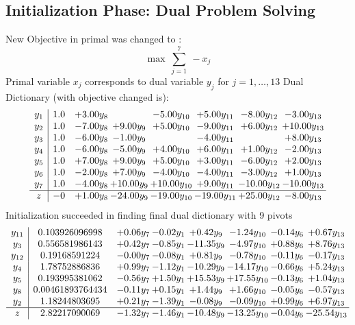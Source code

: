 \documentclass[9pt]{article}
\begin{document}
\subsection{Initialization Phase: Dual Problem Solving}
New Objective in primal was changed to : \[ \max\ \sum_{j=1}^{7}\ - x_j \] 
Primal variable $x_j$ corresponds to dual variable $y_j$ for $j = 1,\ldots,13$
Dual Dictionary (with objective changed is): 
\[\begin{array}{c| c c@{\hskip 2pt} c@{\hskip 2pt} c@{\hskip 2pt} c@{\hskip 2pt} c@{\hskip 2pt} c@{\hskip 2pt} }
 y_{1}   &  1.0 & +  3.00 y_{8} &   & -5.00 y_{10} & +  5.00 y_{11} & -8.00 y_{12} & -3.00 y_{13}\\
 y_{2}   &  1.0 & -7.00 y_{8} & +  9.00 y_{9} & +  5.00 y_{10} & -9.00 y_{11} & +  6.00 y_{12} & + 10.00 y_{13}\\
 y_{3}   &  1.0 & -6.00 y_{8} & -1.00 y_{9} &   & -4.00 y_{11} &   & +  8.00 y_{13}\\
 y_{4}   &  1.0 & -6.00 y_{8} & -5.00 y_{9} & +  4.00 y_{10} & +  6.00 y_{11} & +  1.00 y_{12} & -2.00 y_{13}\\
 y_{5}   &  1.0 & +  7.00 y_{8} & +  9.00 y_{9} & +  5.00 y_{10} & +  3.00 y_{11} & -6.00 y_{12} & +  2.00 y_{13}\\
 y_{6}   &  1.0 & -2.00 y_{8} & +  7.00 y_{9} & -4.00 y_{10} & -4.00 y_{11} & -3.00 y_{12} & +  1.00 y_{13}\\
 y_{7}   &  1.0 & -4.00 y_{8} & + 10.00 y_{9} & + 10.00 y_{10} & +  9.00 y_{11} & -10.00 y_{12} & -10.00 y_{13}\\
\hline
z    &  -0 & +  1.00 y_{8} & -24.00 y_{9} & -19.00 y_{10} & -19.00 y_{11} & + 25.00 y_{12} & -8.00 y_{13}\\
\end{array}\]
Initialization succeeded in finding final dual dictionary with 9 pivots
\[\begin{array}{c| c c@{\hskip 2pt} c@{\hskip 2pt} c@{\hskip 2pt} c@{\hskip 2pt} c@{\hskip 2pt} c@{\hskip 2pt} }
 y_{11}   &  0.103926096998 & +  0.06 y_{7} & -0.02 y_{1} & +  0.42 y_{9} & -1.24 y_{10} & -0.14 y_{6} & +  0.67 y_{13}\\
 y_{3}   &  0.556581986143 & +  0.42 y_{7} & -0.85 y_{1} & -11.35 y_{9} & -4.97 y_{10} & +  0.88 y_{6} & +  8.76 y_{13}\\
 y_{12}   &  0.19168591224 & -0.00 y_{7} & -0.08 y_{1} & +  0.81 y_{9} & -0.78 y_{10} & -0.11 y_{6} & -0.17 y_{13}\\
 y_{4}   &  1.78752886836 & +  0.99 y_{7} & -1.12 y_{1} & -10.29 y_{9} & -14.17 y_{10} & -0.66 y_{6} & +  5.24 y_{13}\\
 y_{5}   &  0.193995381062 & -0.56 y_{7} & +  1.50 y_{1} & + 15.53 y_{9} & + 17.55 y_{10} & -0.13 y_{6} & +  1.04 y_{13}\\
 y_{8}   &  0.00461893764434 & -0.11 y_{7} & +  0.15 y_{1} & +  1.44 y_{9} & +  1.66 y_{10} & -0.05 y_{6} & -0.57 y_{13}\\
 y_{2}   &  1.18244803695 & +  0.21 y_{7} & -1.39 y_{1} & -0.08 y_{9} & -0.09 y_{10} & +  0.99 y_{6} & +  6.97 y_{13}\\
\hline
z    &  2.82217090069 & -1.32 y_{7} & -1.46 y_{1} & -10.48 y_{9} & -13.25 y_{10} & -0.04 y_{6} & -25.54 y_{13}\\
\end{array}\]
\end{document}
